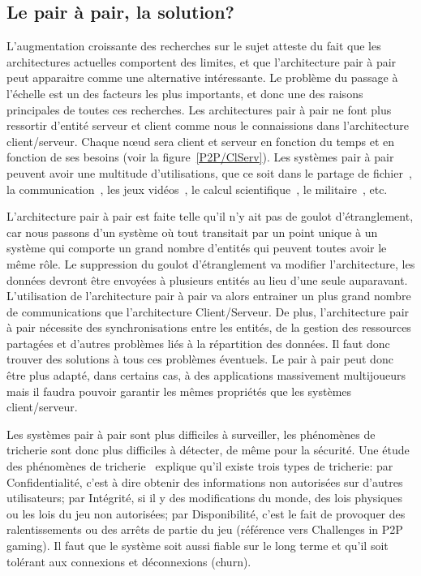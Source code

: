 	\subsection{Le pair à pair, la solution?}
	\par L'augmentation croissante des recherches sur le sujet atteste du fait que les architectures actuelles comportent des limites, et que l'architecture pair à pair peut apparaitre comme une alternative intéressante. Le problème du passage à l'échelle est un des facteurs les plus importants, et donc une des raisons principales de toutes ces recherches. Les architectures pair à pair ne font plus ressortir d'entité serveur et client comme nous le connaissions dans l'architecture client/serveur. Chaque nœud sera client et serveur en fonction du temps et en fonction de ses besoins (voir la figure~\ref{P2P/ClServ}). Les systèmes pair à pair peuvent avoir une multitude d'utilisations, que ce soit dans le partage de fichier~\cite{gnutella,napster,kazaa}, la communication~\cite{skype}, les jeux vidéos~\cite{starwars}, le calcul scientifique~\cite{Pastry,xtremweb,chord}, le militaire~\cite{jxta}, etc. \\
	\par L'architecture pair à pair est faite telle qu'il n'y ait pas de goulot d'étranglement, car nous passons d'un système où tout transitait par un point unique à un système qui comporte un grand nombre d'entités qui peuvent toutes avoir le même rôle. Le suppression du goulot d'étranglement va modifier l'architecture, les données devront être envoyées à plusieurs entités au lieu d'une seule auparavant. L'utilisation de l'architecture pair à pair va alors entrainer un plus grand nombre de communications que l'architecture Client/Serveur. De plus, l'architecture pair à pair nécessite des synchronisations entre les entités, de la gestion des ressources partagées et d'autres problèmes liés à la répartition des données. Il faut donc trouver des solutions à tous ces problèmes éventuels. Le pair à pair peut donc être plus adapté, dans certains cas, à des applications massivement multijoueurs mais il faudra pouvoir garantir les mêmes propriétés que les systèmes client/serveur. \\
	\par Les systèmes pair à pair sont plus difficiles à surveiller, les phénomènes de tricherie sont donc plus difficiles à détecter, de même pour la sécurité. Une étude des phénomènes de tricherie~\cite{1198269} explique qu'il existe trois types de tricherie: par Confidentialité, c'est à dire obtenir des informations non autorisées sur d'autres utilisateurs; par Intégrité, si il y des modifications du monde, des lois physiques ou les lois du jeu non autorisées; par Disponibilité, c'est le fait de provoquer des ralentissements ou des arrêts de partie du jeu (référence vers Challenges in P2P gaming). Il faut que le système soit aussi fiable sur le long terme et qu'il soit tolérant aux connexions et déconnexions (churn).\\
